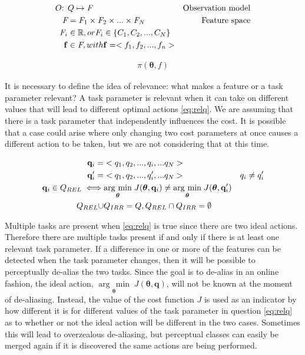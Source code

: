 \documentclass[12pt]{article}
\newcommand{\feat}   {\ensuremath{f}}
\newcommand{\featsp} {\ensuremath{\emph{F}}}
\newcommand{\taskp}  {\ensuremath{\mathbf{q}}}
\newcommand{\taskpv} {\ensuremath{q}}
\newcommand{\costf}  {\ensuremath{J}}
\newcommand{\obsm}   {\ensuremath{O}}
\newcommand{\app}    {\ensuremath{\bm{\theta}}}
\newcommand{\taskpsp}{\ensuremath{Q}}
\newcommand{\featv}  {\ensuremath{\mathbf{f}}}
\newcommand{\argmin}[1]{\underset{#1}{\operatorname{arg}\,\operatorname{min}}\;}
\begin{document}
\begin{align}
\obsm\mbox{: } &\label{eq:obs}\taskpsp \mapsto \featsp& \mbox{Observation model}\\
\featsp &= \featsp_1 \times \featsp_2 \times ... \times \featsp_N & \mbox{Feature space}\\
\featsp_i &\in \mathbb{R}, or \featsp_i \in \{C_1,C_2,...,C_N\}&\notag\\
\featv &\in \featsp, with \featv = <\feat_1,\feat_2,...,\feat_n>&
\end{align}

\begin{align}
\label{eq:fgating}\pi(\app,\feat)
\end{align}

It is necessary to define the idea of relevance: what makes a feature or a task parameter relevant? A task parameter is relevant when it can take on different values that will lead to different optimal actions \eqref{eq:relq}. We are assuming that there is a task parameter that independently influences the cost. It is possible that a case could arise where only changing two cost parameters at once causes a different action to be taken, but we are not considering that at this time. 

\begin{align}
\taskp_i =& <\taskpv_1,\taskpv_2,...,\taskpv_i,...\taskpv_N> \notag & 
\\
\taskp'_i =& <\taskpv_1,\taskpv_2,...,\taskpv'_i,...\taskpv_N> \notag & \taskpv_i \neq \taskpv'_i \\
\label{eq:relq} \taskp_i \in \taskpsp_{REL} \iff&\argmin{\app}\costf(\app,\taskp_i) \neq \argmin{\app}\costf(\app,\taskp'_i)\\
\taskpsp_{REL} \cup & \taskpsp_{IRR} = \taskpsp,   \taskpsp_{REL} \cap \taskpsp_{IRR} = \emptyset 
\end{align}

Multiple tasks are present when \eqref{eq:relq} is true since there are two ideal actions. Therefore there are multiple tasks present if and only if there is at least one relevant task parameter. If a difference in one or more of the features can be detected when the task parameter changes, then it will be possible to perceptually de-alias the two tasks. Since the goal is to de-alias in an online fashion, the ideal action, $\argmin{\app}\costf(\app,\taskp)$, will not be known at the moment of de-aliasing. Instead, the value of the cost function $\costf$ is used as an indicator by how different it is for different values of the task parameter in question \eqref{eq:relq} as to whether or not the ideal action will be different in the two cases. Sometimes this will lead to overzealous de-aliasing, but perceptual classes can easily be merged again if it is discovered the same actions are being performed.
\end{document}
